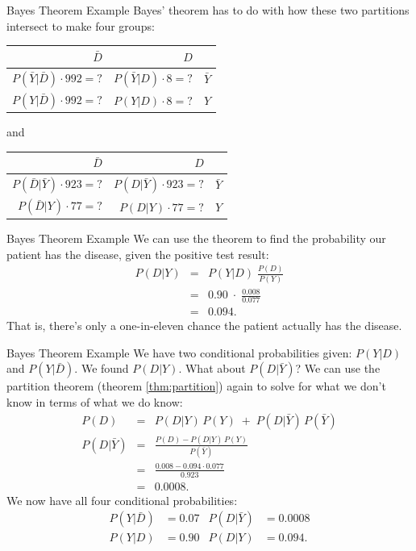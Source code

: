 \begin{frame}{Bayes Theorem  Example }
Bayes' theorem has to do with how these two partitions intersect to make four
groups:
	\begin{tabular}{|r|r||c|}
	\hline $\bar{D}$ & $D$ & \\
	\hline
	\hline  $P(\bar{Y}|\bar{D}) \cdot 992 = ?$ & $P(\bar{Y}|D) \cdot 8 = ?$ & $\bar{Y}$ \\
	\hline  $P(Y    |\bar{D}) \cdot 992 = ?$ & $P(Y    |D) \cdot 8 = ?$ & $Y$ \\
	\hline
	\end{tabular}
%
	\qquad
	
	
	\textrm{and}
	
	
	\qquad
	
%
	\begin{tabular}{|r|r||c|}
	\hline $\bar{D}$ & $D$ & \\
	\hline
	\hline  $P(\bar{D}|\bar{Y}) \cdot 923 = ?$ & $P(D|\bar{Y}) \cdot 923 = ?$ & $\bar{Y}$ \\
	\hline  $P(\bar{D}|Y)     \cdot  77 = ?$ & $P(D|Y)     \cdot  77 = ?$ & $Y$ \\
	\hline
	\end{tabular}
\end{frame}




\begin{frame}{Bayes Theorem  Example }
We can use the theorem to find the probability our patient has the
disease, given the positive test result:
\begin{eqnarray*}
	P(D|Y) &=& P(Y|D) \; \frac{P(D)}{P(Y)} \\
	&=& 0.90 \;\cdot\; \frac{0.008}{0.077} \\
	&=& 0.094.
\end{eqnarray*}
That is, there's only a one-in-eleven chance the patient actually has the
disease.
\end{frame}

\begin{frame}{Bayes Theorem  Example }
We have two conditional probabilities given:  $P(Y|D)$ and $P(Y|\bar{D})$.  We
found $P(D|Y)$.  What about $P(D|\bar{Y})$?  We can use the  partition theorem
(theorem \ref{thm:partition}) again to solve for what we don't know in terms of
what we do know:
\begin{eqnarray*}
	P(D) &=& P(D|Y)\,P(Y) \;+\; P(D|\bar{Y})\,P(\bar{Y}) \\
	P(D|\bar{Y}) &=& \frac{P(D) - P(D|Y)\,P(Y)}{P(\bar{Y})} \\
	&=& \frac{0.008 - 0.094 \cdot 0.077}{0.923} \\
	&=& 0.0008.
\end{eqnarray*}
We now have all four conditional probabilities:
\begin{align*}
	P(Y|\bar{D}) &= 0.07  & P(D|\bar{Y}) &= 0.0008 \\
	P(Y|D)     &= 0.90  & P(D|Y)     &= 0.094.
\end{align*}
\end{frame}

